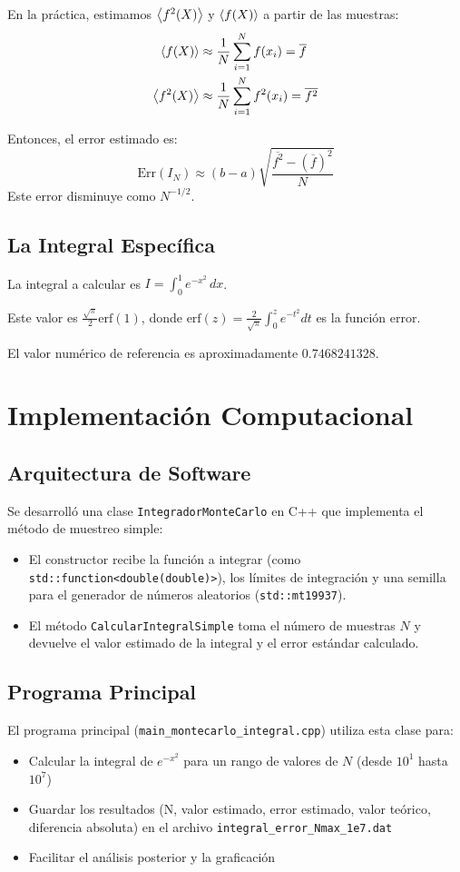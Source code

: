 \documentclass[11pt,a4paper]{article}
\begin{document}
En la práctica, estimamos $\expval{f^2(X)}$ y $\expval{f(X)}$ a partir de las muestras:
\begin{align}
    \expval{f(X)} &\approx \frac{1}{N} \sum_{i=1}^N f(x_i) = \overline{f} \\
    \expval{f^2(X)} &\approx \frac{1}{N} \sum_{i=1}^N f^2(x_i) = \overline{f^2}
\end{align}

Entonces, el error estimado es:
\begin{equation}
    \text{Err}(I_N) \approx (b-a) \sqrt{\frac{\overline{f^2} - (\overline{f})^2}{N}}
\end{equation}
Este error disminuye como $N^{-1/2}$.

\subsection{La Integral Específica}
La integral a calcular es $I = \displaystyle\int_0^1 e^{-x^2}\,dx$.

Este valor es $\frac{\sqrt{\pi}}{2}\text{erf}(1)$, donde $\text{erf}(z) = \frac{2}{\sqrt{\pi}}\int_0^z e^{-t^2}dt$ es la función error.

El valor numérico de referencia es aproximadamente $0.7468241328$.

\section{Implementación Computacional}

\subsection{Arquitectura de Software}
Se desarrolló una clase \texttt{IntegradorMonteCarlo} en C++ que implementa el método de muestreo simple:

\begin{itemize}
    \item El constructor recibe la función a integrar (como \texttt{std::function<double(double)>}), los límites de integración y una semilla para el generador de números aleatorios (\texttt{std::mt19937}).
    \item El método \texttt{CalcularIntegralSimple} toma el número de muestras $N$ y devuelve el valor estimado de la integral y el error estándar calculado.
\end{itemize}

\subsection{Programa Principal}
El programa principal (\texttt{main\_montecarlo\_integral.cpp}) utiliza esta clase para:
\begin{itemize}
    \item Calcular la integral de $e^{-x^2}$ para un rango de valores de $N$ (desde $10^1$ hasta $10^7$)
    \item Guardar los resultados (N, valor estimado, error estimado, valor teórico, diferencia absoluta) en el archivo \texttt{integral\_error\_Nmax\_1e7.dat}
    \item Facilitar el análisis posterior y la graficación
\end{itemize}
\end{document}
